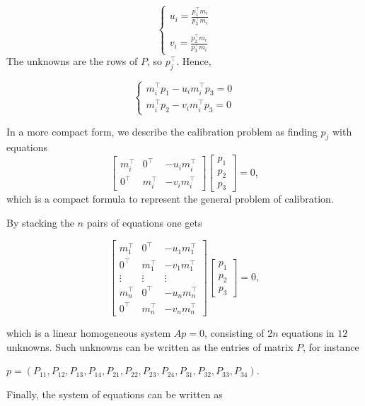 \documentclass[10pt]{report}
\begin{document}
\[\left\{\begin{array}{l} u_i = \displaystyle \frac{p_1^\top m_i}{p_3^\top m_i}\\ \\ v_i =\displaystyle  \frac{p_2^\top m_i}{p_3^\top m_i} \end{array}\right.\]
The unknowns are the rows of \(P\), so \(p_j^\top\). Hence,

\[\left\{\begin{array}{l} m_i^\top p_1 - u_i m_i^\top p_3 = 0\\ m_i^\top p_2 - v_i m_i^\top p_3 = 0 \end{array}\right.\]

In a more compact form, we describe the calibration problem as finding
\(p_j\) with equations
\[\begin{bmatrix} m_i^\top & 0^\top & -u_im_i^\top\\ 0^\top & m_i^\top & -v_i m_i^\top \end{bmatrix} \begin{bmatrix} p_1 \\ p_2 \\ p_3 \end{bmatrix} = 0,\]
which is a compact formula to represent the general problem of
calibration.

By stacking the \(n\) pairs of equations one gets

\[ \begin{bmatrix} m_1^\top & 0^\top & -u_1 m_1^\top   \\ 0^\top   & m_1^\top & -v_1 m_1^\top \\ \vdots   & \vdots & \vdots          \\ m_n^\top & 0^\top & -u_n m_n^\top   \\ 0^\top   & m_n^\top & -v_n m_n^\top \end{bmatrix} \begin{bmatrix} p_1 \\ p_2 \\ p_3 \end{bmatrix} = 0, \]

which is a linear homogeneous system \(Ap = 0\), consisting of \(2n\)
equations in \(12\) unknowns. Such unknowns can be written as the
entries of matrix \(P\), for instance

\(p = (P_{11}, P_{12}, P_{13}, P_{14}, P_{21}, P_{22}, P_{23}, P_{24}, P_{31}, P_{32}, P_{33}, P_{34})\).

Finally, the system of equations can be written as
\end{document}
